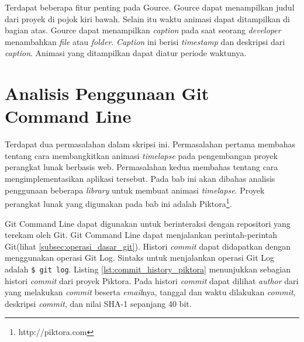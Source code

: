 Terdapat beberapa fitur penting pada Gource. Gource dapat menampilkan judul dari proyek di pojok kiri bawah. Selain itu waktu animasi dapat ditampilkan di bagian atas. Gource dapat menampilkan \textit{caption} pada saat seorang \textit{developer} menambahkan \textit{file} atau \textit{folder}. \textit{Caption} ini berisi \textit{timestamp} dan deskripsi dari \textit{caption}. Animasi yang ditampilkan dapat diatur periode waktunya.  
 
 \section{Analisis Penggunaan Git Command Line}
\label{sec:analisis_git}

Terdapat dua permasalahan dalam skripsi ini. Permasalahan pertama membahas tentang cara membangkitkan animasi \textit{timelapse} pada pengembangan proyek perangkat lunak berbasis web. Permasalahan kedua membahas tentang cara mengimplementasikan aplikasi tersebut. Pada bab ini akan dibahas analisis penggunaan beberapa \textit{library} untuk membuat animasi \textit{timelapse}. Proyek perangkat lunak yang digunakan pada bab ini adalah Piktora\footnote{http://piktora.com}. 

Git Command Line dapat digunakan untuk berinteraksi dengan repositori yang terekam oleh Git. Git Command Line dapat menjalankan perintah-perintah Git(lihat \ref{subsec:operasi_dasar_git}). Histori \textit{commit} dapat didapatkan dengan menggunakan operasi Git Log. Sintaks untuk menjalankan operasi Git Log adalah \texttt{\$ git log}. Listing \ref{lst:commit_history_piktora} menunjukkan sebagian histori \textit{commit} dari proyek Piktora. Pada histori \textit{commit} dapat dilihat \textit{author} dari yang melakukan \textit{commit} beserta \textit{email}nya, tanggal dan waktu dilakukan \textit{commit}, deskripsi \textit{commit}, dan nilai SHA-1 sepanjang 40 bit. 

